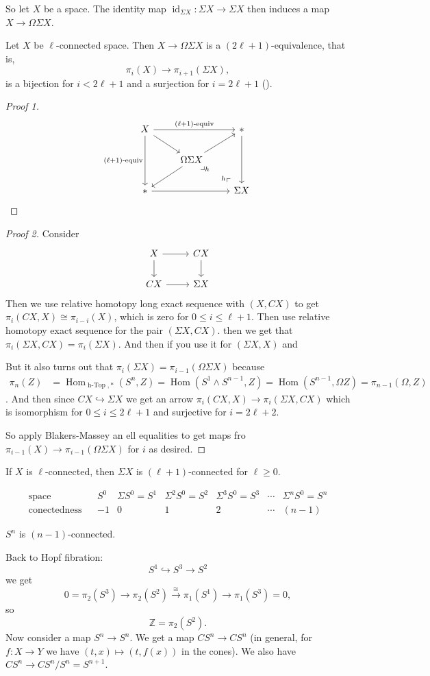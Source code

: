 \documentclass{article}
\newcommand{\Z}{\mathbb{Z}}
\DeclareMathOperator{\id}{id}
\DeclareMathOperator{\hTop}{h-Top}
\DeclareMathOperator{\Hom}{Hom}
\begin{document}
So let $X$ be a space. The identity map $\id_{\Sigma X}:\Sigma X\to \Sigma X$ then induces a map $X\to\Omega\Sigma X$.
\begin{thm}[Freudenthal]\label{thm:freudenthal}
	Let $X$ be $\ell$-connected space. Then $X\to\Omega\Sigma X$ is a $(2\ell+1)$-equivalence, that is,
	\[\pi_i(X)\to \pi_{i+1}(\Sigma X),\]
	is a bijection for $i<2\ell+1$ {\color{cyan}and a surjection for $i=2\ell+1$ (\cite{may})}.
\end{thm}
\begin{proof}[Proof 1]
	\[\begin{tikzcd}
	X\arrow[rr,"(\ell+1)\text{-equiv}"]\arrow[rd]\arrow[dd,"(\ell+1)\text{-equiv}",swap]&&*\arrow[dd]\\
	&\Omega \Sigma X \arrow[rd, phantom, "\lrcorner_h", very near start]\arrow[ur]\arrow[ld]\\
	*\arrow[rr]&&\Sigma X\arrow[ul,phantom,"\prescript{h}{}\ulcorner ",very near start]
	\end{tikzcd}\]
\end{proof}
\begin{proof}[Proof 2]
	Consider
	\[\begin{tikzcd}
		X\arrow[r]\arrow[d]&CX\arrow[d]\\
		CX\arrow[r]&\Sigma X
	\end{tikzcd}\]
	Then we use relative homotopy long exact sequence with $(X,CX)$ to get $\pi_i(CX,X)\cong\pi_{i-i}(X)$, which is zero for $0\leq i\leq \ell+1$. Then use relative homotopy exact sequence for the pair $(\Sigma X,CX)$. then we get that $\pi_i(\Sigma X,CX)=\pi_i(\Sigma X)$. And then if you use it for $(\Sigma X, X)$ and 
	
	But it also turns out that $\pi_i(\Sigma X)=\pi_{i-1}(\Omega\Sigma X)$ because
	\begin{align*}
		\pi_n(Z)&=\Hom_{\hTop,*}(S^n,Z)=\Hom(S^1\wedge S^{n-1},Z)=\Hom(S^{n-1},\Omega Z)=\pi_{n-1}(\Omega,Z)
	\end{align*}.
	And then since $CX\hookrightarrow \Sigma X$ we get an arrow $\pi_i(CX,X)\to\pi_i(\Sigma X,CX)$ which is isomorphism for $0\leq i \leq 2\ell +1$ and surjective for $i=2\ell+2$.
	
	So apply Blakers-Massey an ell equalities to get maps fro $\pi_{i-1}(X)\to\pi_{i-1}(\Omega\Sigma X)$ for $i$ as desired.
\end{proof}
\begin{coro}
	If $X$ is $\ell$-connected, then $\Sigma X$ is $(\ell+1)$-connected for $\ell\geq0$.
\end{coro}
\[\begin{matrix}
	\text{space}&&S^0&\Sigma S^0=S^1&\Sigma^2S^0=S^2&\Sigma^3S^0=S^3&\cdots&\Sigma^nS^0=S^n\\
	\text{conectedness}&&-1&0&1&2&\cdots&(n-1)
\end{matrix}\]
\begin{coro}
	$S^n$ is $(n-1)$-connected.
\end{coro}
Back to Hopf fibration:
\[S^1\hookrightarrow S^3\to S^2\]
we get
\[0=\pi_2(S^3)\to\pi_2(S^2)\overset{\cong}{\to}\pi_1(S^1)\to\pi_1(S^3)=0,\]
so
\[\Z=\pi_2(S^2).\]
Now consider a map $S^n\to S^n$. We get a map $CS^n\to CS^n$ (in general, for $f:X\to Y$ we have $(t,x)\mapsto(t,f(x))$ in the cones). We also have $CS^n\to CS^n/S^n=S^{n+1}$.
\end{document}
